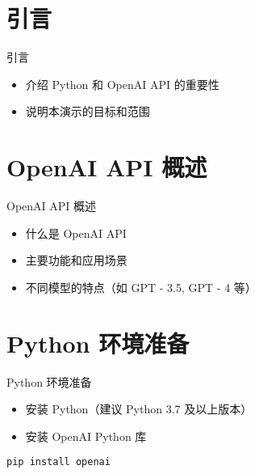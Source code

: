 \small
\section{引言}
\begin{frame}{引言}
    \begin{itemize}
        \item 介绍 Python 和 OpenAI API 的重要性
        \item 说明本演示的目标和范围
    \end{itemize}
\end{frame}

\section{OpenAI API 概述}
\begin{frame}{OpenAI API 概述}
    \begin{itemize}
        \item 什么是 OpenAI API
        \item 主要功能和应用场景
        \item 不同模型的特点（如 GPT - 3.5, GPT - 4 等）
    \end{itemize}
\end{frame}

\section{Python 环境准备}
\begin{frame}{Python 环境准备}
    \begin{itemize}
        \item 安装 Python（建议 Python 3.7 及以上版本）
        \item 安装 OpenAI Python 库
    \end{itemize}
    \begin{lstlisting}[style=pythonstyle]
pip install openai
    \end{lstlisting}
\end{frame}

